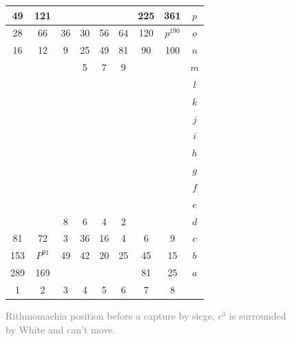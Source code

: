 \documentclass[12pt]{article}
\begin{document}
\begin{figure}[h!] 
\centering
\begin{tabular}{|c|c|c|c|c|c|c|c||c} \hline
\squadfill{\,}49 & \squadfill{\,}121 & \quad  & \quad  & \quad  & \quad  & \squadfill{\,}225 & \squadfill{\,}361 & $p$ \\ \hline
\squadfill{\,}28 & \squadfill{\,}66 & \trianglepafill{\,}36 & \trianglepafill{\,}30 & \trianglepafill{\,}56 & \trianglepafill{\,}64 & \squadfill{\,}120 & \rhombusfill{\,}$p^{190}$ & $o$ \\ \hline
\trianglepafill{\,}16 & \trianglepafill{\,}12 & \circletfill{\,}9 & \circletfill{\,}25 & \circletfill{\,}49 & \circletfill{\,}81 & \trianglepafill{\,}90 & \trianglepafill{\,}100 & $n$ \\ \hline
\quad  & \quad  & \quad  & \circletfill{\,}5 & \circletfill{\,}7 & \circletfill{\,}9 & \quad  & \quad  & $m$ \\ \hline
\quad  & \quad  & \quad  & \quad  & \quad  & \quad  & \quad  & \quad  & $l$ \\ \hline
\quad  & \quad  & \quad  & \quad  & \quad  & \quad  & \quad  & \quad  & $k$ \\ \hline
\quad  & \quad  & \quad  & \quad  & \quad  & \quad  & \quad  & \quad  & $j$ \\ \hline
\quad  & \quad  & \quad  & \quad  & \quad  & \quad  & \quad  & \quad  & $i$ \\ \hline
\quad  & \quad  & \quad  & \quad  & \quad  & \quad  & \quad  & \quad  & $h$ \\ \hline
\quad  & \quad  & \quad  & \quad  & \quad  & \quad  & \quad  & \quad  & $g$ \\ \hline
\quad  & \quad  & \quad  & \quad  & \quad  & \quad  & \quad  & \quad  & $f$ \\ \hline
\quad  & \quad  & \quad  & \quad  & \quad  & \quad  & \quad  & \quad  & $e$ \\ \hline
\quad  & \quad  & \circlet{\,}8 & \circlet{\,}6 & \circlet{\,}4 & \circlet{\,}2 & \quad  & \quad  & $d$ \\ \hline
\trianglepa{\,}81 & \trianglepa{\,}72 & \circletfill{\,}3 & \circlet{\,}36 & \circlet{\,}16 & \circlet{\,}4 & \trianglepa{\,}6 & \trianglepa{\,}9 & $c$ \\ \hline
\squad{\,}153 & \rhombus{\,}$P^{91}$ & \trianglepa{\,}49 & \trianglepa{\,}42 & \trianglepa{\,}20 & \trianglepa{\,}25 & \squad{\,}45 & \squad{\,}15 & $b$ \\ \hline
\squad{\,}289 & \squad{\,}169 & \quad  & \quad  & \quad  & \quad  & \squad{\,}81 & \squad{\,}25 & $a$ \\ \hline
1 &  2 &  3 &  4 &  5 &  6 &  7 &  8  &  \\
\end{tabular}  
\caption{\textcolor{gray}{Rithmomachia position before a capture by siege, $c^3$ is surrounded by White and can't move.}}
\label{fig:rithmomachia-capture-by-siege-with-pyramid3} 
\end{figure}
\end{document}
